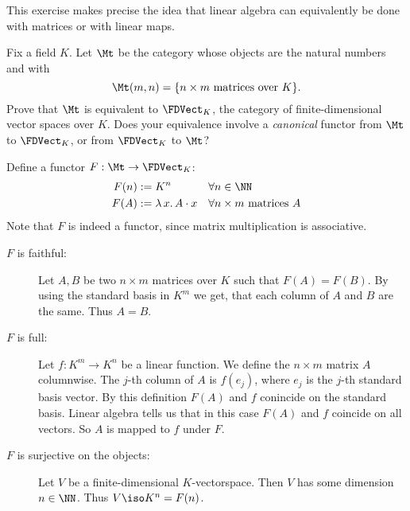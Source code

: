 \begin{exercise}
This exercise makes precise the idea that linear algebra can equivalently
be done with matrices or with linear maps.

Fix a field $K$.  Let $\Mt$ be the category whose objects are the natural
numbers and with
\[ \Mt(m, n) = \{ n \times m \text{ matrices over } K \}. \]
Prove that $\Mt$ is equivalent to $\FDVect_K$, the category of
finite-dimensional vector spaces over $K$.
Does your equivalence involve a \emph{canonical} functor from $\Mt$ to $\FDVect_K$, or from $\FDVect_K$ to $\Mt$?
\end{exercise}
\begin{answer}
    Define a functor $F: \Mt \to \FDVect_K$:
    \begin{align*}
        F(n) & := K^n && \forall n \in \NN\\
        F(A) & := \lambda\, x. \, A \cdot x && \forall n \times m \text{ matrices } A
    \end{align*}
    Note that $F$ is indeed a functor, since matrix multiplication is associative.
    \begin{description}
        \item[$F$ is faithful:]
            Let $A, B$ be two $n \times m$ matrices over $K$ such that $F(A) = F(B)$.
            By using the standard basis in $K^m$ we get, that each column of $A$ and $B$ are the same.
            Thus $A = B$.
        \item[$F$ is full:]
            Let $f: K^m \to K^n$ be a linear function.
            We define the $n \times m$ matrix $A$ columnwise.
            The $j$-th column of $A$ is $f(e_j)$, where $e_j$ is the $j$-th standard basis vector.
            By this definition $F(A)$ and $f$ conincide on the standard basis.
            Linear algebra tells us that in this case $F(A)$ and $f$ coincide on all vectors.
            So $A$ is mapped to $f$ under $F$.
        \item[$F$ is surjective on the objects:]
            Let $V$ be a finite-dimensional $K$-vectorspace.
            Then $V$ has some dimension $n \in \NN$.
            Thus $V \iso K^n = F(n)$.
    \end{description}
\end{answer}



